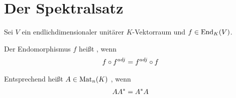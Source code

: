 \section{Der Spektralsatz}

Sei $V$ ein endlichdimensionaler unitärer $K$-Vektorraum und $f\in\operatorname{End}_K(V)$.

\begin{definition}
	Der Endomorphismus $f$ heißt , wenn
	\begin{align}
		f\circ f^{adj}=f^{adj}\circ f\notag
	\end{align}
	
	Entsprechend heißt $A\in\operatorname{Mat}_n(K)$ , wenn
	\begin{align}
		AA^*=A^*A\notag
	\end{align}
\end{definition}

